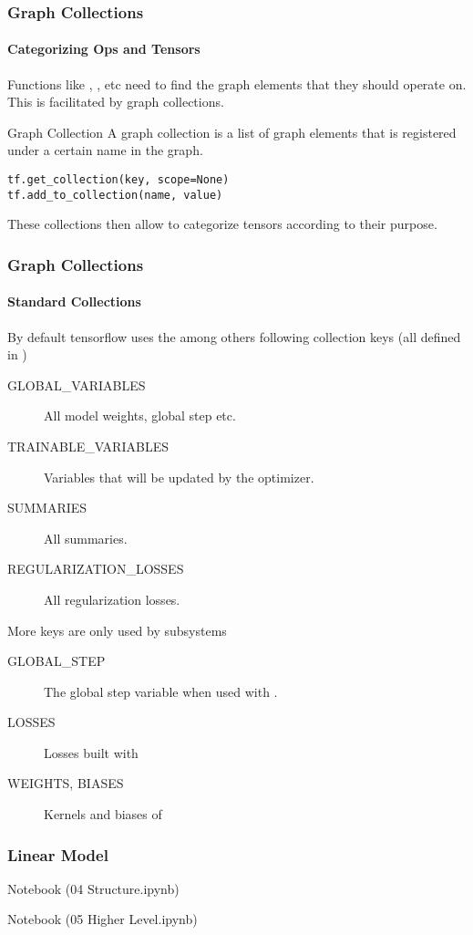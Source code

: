 \begin{frame}[fragile]
    \frametitle{Graph Collections}
    \framesubtitle{Categorizing Ops and Tensors}
    \begin{block}{}
    Functions like , , etc need to find the graph elements that they should operate on.
    This is facilitated by graph collections.
    \end{block}
    \begin{block}{Graph Collection}
        A graph collection is a list of graph elements that is registered under a certain name in the graph.
        \begin{lstlisting}
tf.get_collection(key, scope=None)
tf.add_to_collection(name, value)
        \end{lstlisting}
        These collections then allow to categorize tensors according to their purpose.
    \end{block}
\end{frame}

\begin{frame}[fragile]
    \frametitle{Graph Collections}
    \framesubtitle{Standard Collections}
    By default tensorflow uses the among others following collection keys (all defined in )
    \begin{description}
        \item[GLOBAL\_VARIABLES] All model weights, global step etc.
        \item[TRAINABLE\_VARIABLES] Variables that will be updated by the optimizer.
        \item[SUMMARIES] All summaries.
        \item[REGULARIZATION\_LOSSES] All regularization losses.
    \end{description}
    \vspace{2em}
    More keys are only used by subsystems
    \begin{description}
        \item[GLOBAL\_STEP] The global step variable when used with .
        \item[LOSSES] Losses built with 
        \item[WEIGHTS, BIASES] Kernels and biases of 
    \end{description}
\end{frame}

\begin{frame}[fragile]
    \frametitle{Linear Model}
    \centering Notebook (04 Structure.ipynb)
\end{frame}

\begin{frame}
    \centering
    Notebook (05 Higher Level.ipynb)
\end{frame}


